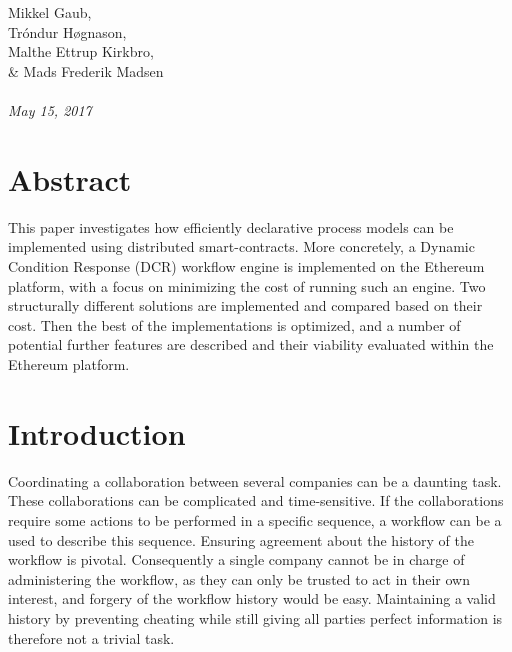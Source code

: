 \documentclass{article}
\begin{document}
\normalem
{}
	\begin{titlepage}
		 \\ \\
		Mikkel Gaub, \\ Tróndur Høgnason, \\ Malthe Ettrup Kirkbro, \\ \& Mads Frederik Madsen	\\ \\
		\hspace{-18pt}
		\textit{May 15, 2017}
		\vspace{\fill}
		\section*{Abstract}
		This paper investigates how efficiently declarative process models can be implemented using distributed smart-contracts. 
		More concretely, a Dynamic Condition Response (DCR) workflow engine is implemented on the Ethereum platform, with a focus on minimizing the cost of running such an engine. 
		Two structurally different solutions are implemented and compared based on their cost.
		Then the best of the implementations is optimized, and a number of potential further features are described and their viability evaluated within the Ethereum platform.
		\thispagestyle{empty}
	\end{titlepage}
	\clearpage

	\setcounter{page}{1}

	\setcounter{tocdepth}{2}
	\tableofcontents
	\pagebreak

	\section{Introduction}
	Coordinating a collaboration between several companies can be a daunting task.
	These collaborations can be complicated and time-sensitive.
	If the collaborations require some actions to be performed in a specific sequence, a workflow can be a used to describe this sequence.
	Ensuring agreement about the history of the workflow is pivotal.
	Consequently a single company cannot be in charge of administering the workflow, as they can only be trusted to act in their own interest, and forgery of the workflow history would be easy.
	Maintaining a valid history by preventing cheating while still giving all parties perfect information is therefore not a trivial task.
\end{document}
